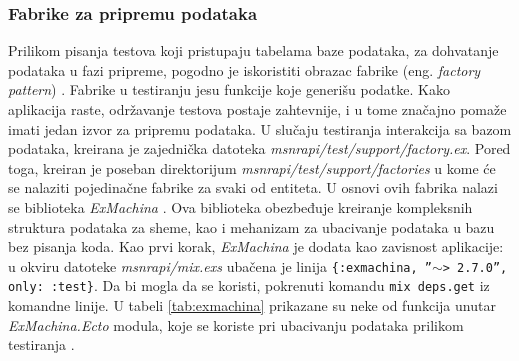 \documentclass[12pt,oneside]{memoir}
\begin{document}
\subsubsection{Fabrike za pripremu podataka}
\par Prilikom pisanja testova koji pristupaju tabelama baze podataka, za dohvatanje podataka u fazi pripreme, pogodno je iskoristiti obrazac fabrike (eng. \emph{factory pattern}) \cite{fabrike}. Fabrike u testiranju jesu funkcije koje generišu podatke. Kako aplikacija raste, održavanje testova postaje zahtevnije, i u tome značajno pomaže imati jedan izvor za pripremu podataka. U slučaju testiranja interakcija sa bazom podataka, kreirana je zajednička datoteka \emph{msnr{\textunderscore}api/test/support/factory.ex}. Pored toga, kreiran je poseban direktorijum \emph{msnr{\textunderscore}api/test/support/factories} u kome će se nalaziti pojedinačne fabrike za svaki od entiteta. U osnovi ovih fabrika nalazi se biblioteka \emph{ExMachina} \cite{exmachina}. Ova biblioteka obezbeđuje kreiranje kompleksnih struktura podataka za sheme, kao i mehanizam za ubacivanje podataka u bazu bez pisanja koda. Kao prvi korak, \emph{ExMachina} je dodata kao zavisnost aplikacije: u okviru datoteke \emph{msnr{\textunderscore}api/mix.exs} ubačena je linija \texttt{\{:exmachina, ''$\sim$> 2.7.0'', only: :test\}}. Da bi mogla da se koristi, pokrenuti komandu \texttt{mix deps.get} iz komandne linije. U tabeli \ref{tab:exmachina} prikazane su neke od funkcija unutar \emph{ExMachina.Ecto} modula, koje se koriste pri ubacivanju podataka prilikom testiranja \cite{execto}.
\end{document}
